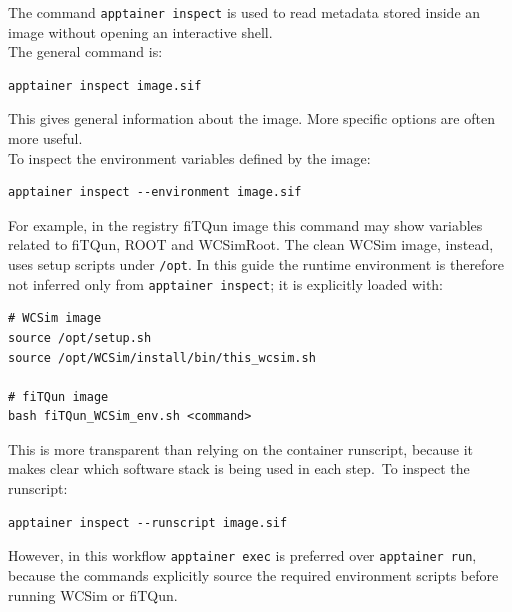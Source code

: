 \documentclass{article}
\numberwithin{table}{subsection}
\numberwithin{figure}{subsection}
\numberwithin{equation}{subsection}
\numberwithin{footnote}{subsection}
\begin{document}
The command \texttt{apptainer inspect} is used to read metadata stored inside an image without opening an interactive shell.\\
The general command is:
\begin{lstlisting}[style=terminal]
apptainer inspect image.sif
\end{lstlisting}
This gives general information about the image. More specific options are often more useful.\\
To inspect the environment variables defined by the image:
\begin{lstlisting}[style=terminal]
apptainer inspect --environment image.sif
\end{lstlisting}
For example, in the registry fiTQun image this command may show variables related to fiTQun, ROOT and WCSimRoot. The clean WCSim image, instead, uses setup scripts under \texttt{/opt}. In this guide the runtime environment is therefore not inferred only from \texttt{apptainer inspect}; it is explicitly loaded with:
\begin{lstlisting}[style=terminal]
# WCSim image
source /opt/setup.sh
source /opt/WCSim/install/bin/this_wcsim.sh

# fiTQun image
bash fiTQun_WCSim_env.sh <command>
\end{lstlisting}
This is more transparent than relying on the container runscript, because it makes clear which software stack is being used in each step.\
To inspect the runscript:
\begin{lstlisting}[style=terminal]
apptainer inspect --runscript image.sif
\end{lstlisting}
However, in this workflow \texttt{apptainer exec} is preferred over \texttt{apptainer run}, because the commands explicitly source the required environment scripts before running WCSim or fiTQun.
\end{document}

